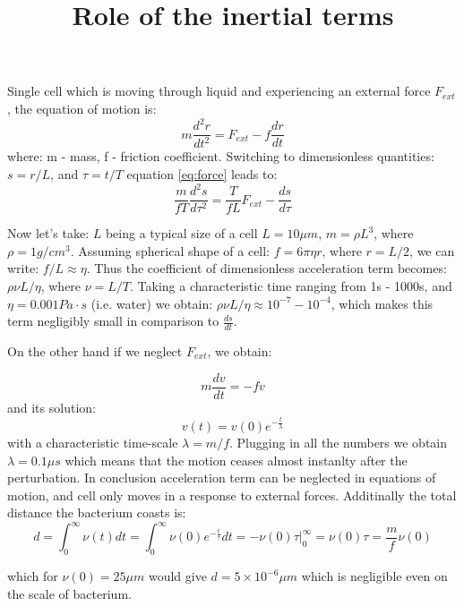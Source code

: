 \documentclass{article}
\begin{document}
\title{Role of the inertial terms}

\maketitle

Single cell which is moving through liquid and experiencing an external force $F_{ext}$, the equation of motion is:
\begin{equation}\label{eq:force}
  m \frac{d^2 r}{dt^2} = F_{ext} - f \frac{d r}{d t}
\end{equation}
where: m - mass, f - friction coefficient.
Switching to dimensionless quantities: $s = r/L$, and $\tau=t/T$ equation \ref{eq:force} leads to:
\begin{equation}
 \frac{m}{f T} \frac{d^2 s}{d \tau^2} = \frac{T}{f L} F_{ext} - \frac{ds}{d \tau}
\end{equation}

Now let's take: $L$ being a typical size of a cell $L=10 \mu m$, $m=\rho L^3$, where $\rho = 1g/cm^3$.
Assuming spherical shape of a cell: $f = 6 \pi \eta r$, where $r=L/2$, we can write: $f/L \approx \eta$.
Thus the coefficient of dimensionless acceleration term becomes: $\rho \nu L / \eta$, where $\nu = L/T$. 
Taking a characteristic time ranging from 1s -  1000s, and $\eta=0.001 Pa \cdot s$ (i.e. water) we obtain:
$\rho \nu L / \eta \approx 10^{-7} - 10^{-4}$, which makes this term negligibly small in comparison to
$\frac{d s}{d t}$.

On the other hand if we neglect $F_{ext}$, we obtain:

\begin{equation}
 m \frac{d v}{d t} = -f v
\end{equation}
and its solution:
\begin{equation}
 v(t) = v(0) e^{-\frac{t}{\lambda}}
\end{equation}
with a characteristic time-scale $\lambda=m/f$. Plugging in all the numbers we obtain $\lambda=0.1 \mu s$ 
which means that the motion ceases almost instanlty after the perturbation.
In conclusion acceleration term can be neglected in equations of motion, and cell only moves in a response to external forces. 
Additinally the total distance the bacterium coasts is:
\begin{equation}
 d = \int_{0}^{\infty} \nu(t) dt = \int_{0}^{\infty} \nu(0)e^{-\frac{t}{\tau}} dt = -\nu(0) \tau | ^{\infty}_{0} = \nu(0) \tau = \frac{m}{f}  \nu(0)
\end{equation}

which for $\nu(0)=25 \mu m$ would give $d = 5 \times 10^{-6} \mu m$ which is negligible even on the scale of bacterium.
\end{document}
